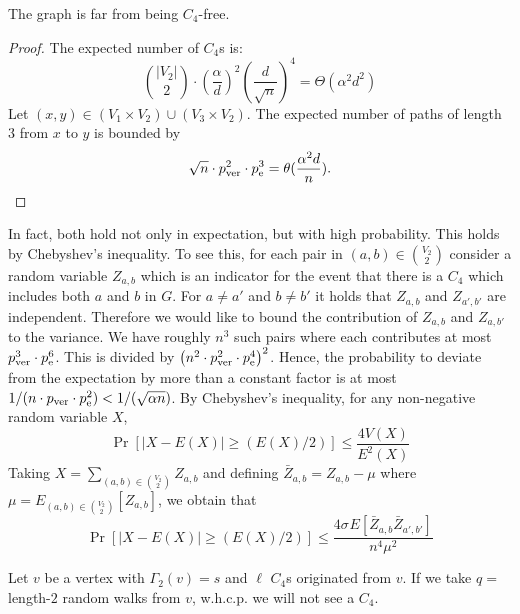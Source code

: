 \begin{claim}
The graph is far from being $C_4$-free.
\end{claim}
\begin{proof}
    The expected number of $C_4$s is:
    \begin{equation}
        {|V_2| \choose 2} \cdot \left(\frac{\alpha}{d}\right)^2 \left(\frac{d}{\sqrt{n}}\right)^4 = \Theta(\alpha^2 d^2)
    \end{equation}
    Let $(x, y) \in (V_1\times V_2) \cup (V_3\times V_2)$. The expected number of paths of length $3$ from $x$ to $y$ is bounded by 
    \begin{equation}
        \sqrt{n} \cdot p^2_{\rm ver} \cdot p^3_{\rm e} = \theta(\frac{\alpha^2 d}{n}).
    \end{equation} 
\end{proof}
In fact, both hold not only in expectation, but with high probability. This holds by Chebyshev's inequality. To see this, for each pair in $(a, b)\in {V_2 \choose 2}$ consider a random variable $Z_{a,b}$ which is an indicator for the event that there is a $C_4$ which includes both $a$ and $b$ in $G$.
For $a \neq a'$ and $b \neq b'$ it holds that $Z_{a,b}$ and $Z_{a',b'}$ are independent.
Therefore we would like to bound the contribution of $Z_{a,b}$ and $Z_{a,b'}$ to the variance. We have roughly $n^3$ such pairs where each contributes at most $p^3_{\rm ver} \cdot p^6_{\rm e}$. This is divided by $\left(n^2 \cdot p^2_{\rm ver} \cdot p^4_{\rm e}\right)^2$. Hence, the probability to deviate from the expectation by more than a constant factor is at most $1/(n \cdot p_{\rm ver} \cdot p^2_{\rm e}) < 1/(\sqrt{\alpha n})$.
By Chebyshev's inequality, for any non-negative random variable $X$,
\begin{equation}
    \Pr\left[\left|X - E(X)\right| \geq (E(X)/2)\right] \leq \frac{4V(X)}{E^2(X)}
\end{equation}
Taking $X = \sum_{(a, b)\in {V_2 \choose 2}} Z_{a, b}$ and defining $\bar{Z}_{a, b} = Z_{a, b} - \mu$ where $\mu = E_{(a, b)\in {V_2 \choose 2}}[Z_{a, b}]$,  
we obtain that 
\begin{equation}
    \Pr\left[\left|X - E(X)\right| \geq (E(X)/2)\right] \leq \frac{4\sigma_{} E[\bar{Z}_{a, b} \bar{Z}_{a', b'}]}{n^4\mu^2}
\end{equation}

\begin{claim}
Let $v$ be a vertex with $\Gamma_2(v) = s$ and $\ell$ $C_4$s originated from $v$.
If we take $q = $ length-$2$ random walks from $v$, w.h.c.p. we will not see a $C_4$.
\end{claim}

